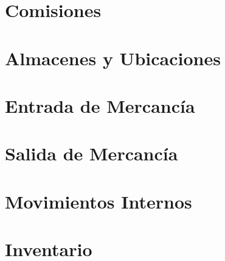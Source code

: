 \documentclass[letterpaper,10pt,spanish]{sphinxmanual}
\begin{document}
\section{Comisiones}
\label{\detokenize{funcional/ventas/comisiones:comisiones}}\label{\detokenize{funcional/ventas/comisiones:id1}}\label{\detokenize{funcional/ventas/comisiones::doc}}


\section{Almacenes y Ubicaciones}
\label{\detokenize{funcional/logistica/almacenes-y-ubicaciones:almacenes-y-ubicaciones}}\label{\detokenize{funcional/logistica/almacenes-y-ubicaciones:id1}}\label{\detokenize{funcional/logistica/almacenes-y-ubicaciones::doc}}

\section{Entrada de Mercancía}
\label{\detokenize{funcional/logistica/entrada-de-mercancia:entrada-de-mercancia}}\label{\detokenize{funcional/logistica/entrada-de-mercancia:id1}}\label{\detokenize{funcional/logistica/entrada-de-mercancia::doc}}

\section{Salida de Mercancía}
\label{\detokenize{funcional/logistica/salida-de-mercancia:salida-de-mercancia}}\label{\detokenize{funcional/logistica/salida-de-mercancia:id1}}\label{\detokenize{funcional/logistica/salida-de-mercancia::doc}}

\section{Movimientos Internos}
\label{\detokenize{funcional/logistica/movimientos-internos:movimientos-internos}}\label{\detokenize{funcional/logistica/movimientos-internos:id1}}\label{\detokenize{funcional/logistica/movimientos-internos::doc}}

\section{Inventario}
\label{\detokenize{funcional/logistica/inventario:inventario}}\label{\detokenize{funcional/logistica/inventario:id1}}\label{\detokenize{funcional/logistica/inventario::doc}}
\end{document}
